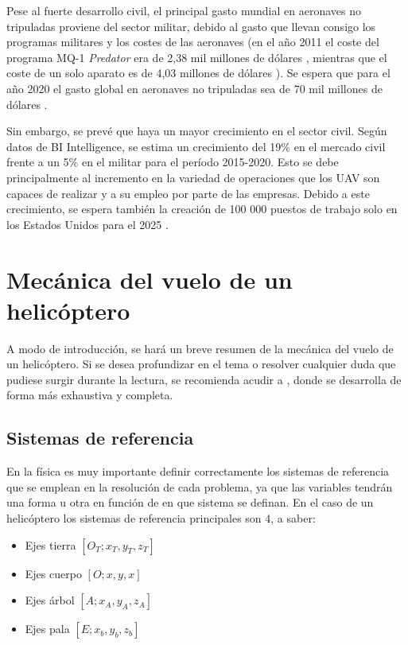 Pese al fuerte desarrollo civil, el principal gasto mundial en aeronaves no tripuladas proviene del sector militar, debido al gasto que llevan consigo los programas militares y los costes de las aeronaves (en el año 2011 el coste del programa MQ-1 \emph{Predator} era de 2,38 mil millones de dólares \citep{Predatorunitbudget}, mientras que el coste de un solo aparato es de 4,03 millones de dólares \citep{Predatorprogrambudget}). Se espera que para el año 2020 el gasto global en aeronaves no tripuladas sea de 70 mil millones de dólares \citep{Goldman}.

Sin embargo, se prevé que haya un mayor crecimiento en el sector civil. Según datos de BI Intelligence, se estima un crecimiento del 19\% en el mercado civil frente a un 5\% en el militar para el período 2015-2020.
Esto se debe principalmente al incremento en la variedad de operaciones que los UAV son capaces de realizar y a su empleo por parte de las empresas. Debido a este crecimiento, se espera también la creación de 100 000 puestos de trabajo solo en los Estados Unidos para el 2025 \citep{AUVSI}.

\section{Mecánica del vuelo de un helicóptero}
A modo de introducción, se hará un breve resumen de la mecánica del vuelo de un helicóptero. Si se desea profundizar en el tema o resolver cualquier duda que pudiese surgir durante la lectura, se recomienda acudir a \citet{Cuerva}, donde se desarrolla de forma más exhaustiva y completa.

\subsection{Sistemas de referencia}
En la física es muy importante definir correctamente los sistemas de referencia que se emplean en la resolución de cada problema, ya que las variables tendrán una forma u otra en función de en que sistema se definan.
En el caso de un helicóptero los sistemas de referencia principales son 4, a saber:
\begin{itemize}
	\item Ejes tierra $[O_{T};x_{T},y_{T},z_{T}]$
	\item Ejes cuerpo $[O;x,y,x]$
	\item Ejes árbol $[A;x_{A},y_{A},z_{A}]$
	\item Ejes pala $[E;x_{b},y_{b},z_{b}]$
\end{itemize}

